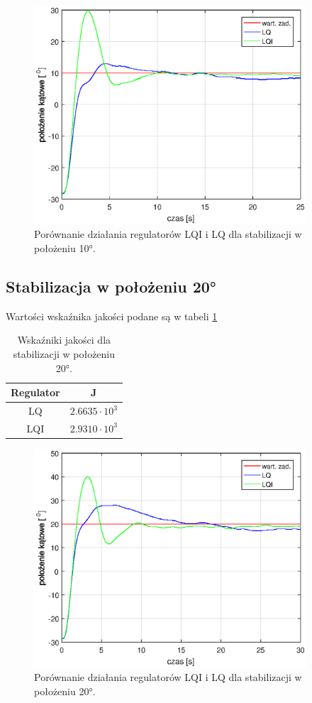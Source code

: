 \documentclass[11pt,a4paper]{article}
\begin{document}
\begin{figure}[H]
	\centering
	\includegraphics[width=4in]{Figures/por_LQ18.eps}
	\caption{Porównanie działania regulatorów LQI i LQ dla stabilizacji w położeniu \ang{10}.}
	\label{fig:por_LQ10}
\end{figure}

\subsection{Stabilizacja w położeniu \texorpdfstring{\ang{20}}{Lg}}

Wartości wskaźnika jakości podane są w tabeli \ref{por_reg_20_tab}

\begin{table}[ht]
	\caption{Wskaźniki jakości dla stabilizacji w położeniu \ang{20}.}
	\label{por_reg_20_tab}
	\centering
	
	\begin{tabular}{|c|c|}
		\hline
		Regulator &J\\
		\hline
		LQ & $2.6635 \cdot 10 ^3$\\
		\hline
		LQI & $2.9310 \cdot 10 ^3$\\
		\hline
	\end{tabular}
\end{table}

\begin{figure}[H]
	\centering
	\includegraphics[width=4in]{Figures/por_LQ9.eps}
	\caption{Porównanie działania regulatorów LQI i LQ dla stabilizacji w położeniu \ang{20}.}
	\label{fig:por_LQ20}
\end{figure}
\end{document}
